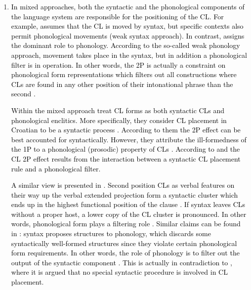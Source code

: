 \begin{enumerate}
\item \textcolor{black}{In mixed approaches, both the syntactic and the phonological components of the language system are responsible for the positioning of the CL. For example, \citet{Schutze94} assumes that the CL is moved by syntax, but specific contexts also permit phonological movements (weak syntax approach). In contrast, \citet[]{Boskovic00, Boskovic01}
 assigns the dominant role to phonology. According to the so-called weak phonology approach, movement takes place in the syntax, but in addition a phonological filter is in operation.} \textcolor{black}{In other words, the 2P is actually a constraint on phonological form representations which filters out all constructions where CLs are found in any other position of their intonational phrase than the second \citep{Boskovic00}.}
 
 \textcolor{black}{Within the mixed approach \citet[431]{CavarWilder94} treat CL forms as both syntactic CLs and phonological enclitics. More specifically, they consider CL placement in Croatian to be a syntactic process \citep[431]{CavarWilder94}. According to them the 2P effect can be best accounted for syntactically. However, they attribute the ill-formedness of the 1P to a phonological (prosodic) property of CLs \citep[431]{CavarWilder94}. According to \citet{WilderCavar94a} and \citet{WilderCavar94b} the CL 2P effect results from the interaction between a syntactic CL placement rule and a phonological filter.} 
 
 \textcolor{black}{A similar view is presented in \citet{Franks00}. Second position CLs as verbal features on their way up the verbal extended projection form a syntactic cluster which ends up in the highest functional position of the clause \citep{Franks00}. If syntax leaves CLs without a proper host, a lower copy of the CL cluster is pronounced. In other words, phonological form plays a filtering role \citep{Franks00}. Similar claims can be found in \citet[264]{Boskovic95}: syntax proposes structures to phonology, which discards some syntactically well-formed structures since they violate certain phonological form requirements. In other words, the role of phonology is to filter out the output of the syntactic component \citep[264]{Boskovic95}. This is actually in contradiction to \citet{Boskovic00}, where it is argued that no special syntactic procedure is involved in CL placement.}
 
\end{enumerate}

